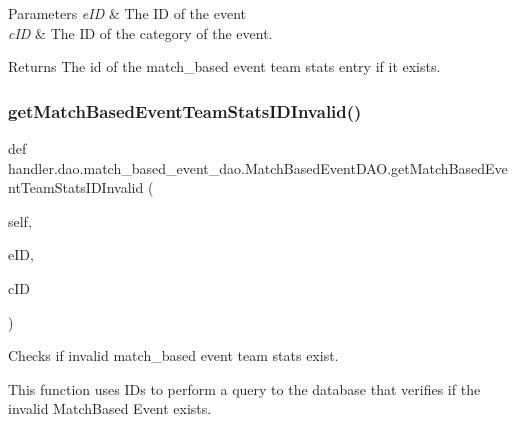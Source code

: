 \begin{DoxyParams}{Parameters}
{\em e\+ID} & The ID of the event \\
\hline
{\em c\+ID} & The ID of the category of the event.\\
\hline
\end{DoxyParams}
\begin{DoxyReturn}{Returns}
The id of the match\+\_\+based event team stats entry if it exists. 
\end{DoxyReturn}
\mbox{\label{classhandler_1_1dao_1_1match__based__event__dao_1_1_match_based_event_d_a_o_ae3ede989233ef64dcd4afc02b3f9d6bc}} 
\subsubsection{\texorpdfstring{get\+Match\+Based\+Event\+Team\+Stats\+I\+D\+Invalid()}{getMatchBasedEventTeamStatsIDInvalid()}}
{\footnotesize\ttfamily def handler.\+dao.\+match\+\_\+based\+\_\+event\+\_\+dao.\+Match\+Based\+Event\+D\+A\+O.\+get\+Match\+Based\+Event\+Team\+Stats\+I\+D\+Invalid (\begin{DoxyParamCaption}\item[{}]{self,  }\item[{}]{e\+ID,  }\item[{}]{c\+ID }\end{DoxyParamCaption})}



Checks if invalid match\+\_\+based event team stats exist. 

This function uses I\+Ds to perform a query to the database that verifies if the invalid Match\+Based Event exists.


